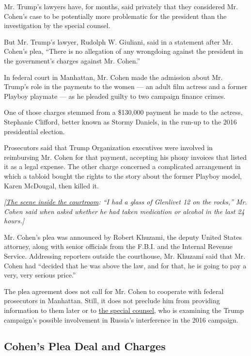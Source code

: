 Mr. Trump's lawyers have, for months, said privately that they
considered Mr. Cohen's case to be potentially more problematic for the
president than the investigation by the special counsel.

But Mr. Trump's lawyer, Rudolph W. Giuliani, said in a statement after
Mr. Cohen's plea, ``There is no allegation of any wrongdoing against the
president in the government's charges against Mr. Cohen.''

In federal court in Manhattan, Mr. Cohen made the admission about Mr.
Trump's role in the payments to the women --- an adult film actress and
a former Playboy playmate --- as he pleaded guilty to two campaign
finance crimes.

One of those charges stemmed from a \$130,000 payment he made to the
actress, Stephanie Clifford, better known as Stormy Daniels, in the
run-up to the 2016 presidential election.

Prosecutors said that Trump Organization executives were involved in
reimbursing Mr. Cohen for that payment, accepting his phony invoices
that listed it as a legal expense. The other charge concerned a
complicated arrangement in which a tabloid bought the rights to the
story about the former Playboy model, Karen McDougal, then killed it.

\emph{{[}}\href{https://www.nytimes.com/2018/08/21/nyregion/michael-cohen-guilty-glenlivet-trump.html}{\emph{The
scene inside the courtroom}}\emph{: ``I had a glass of Glenlivet 12 on
the rocks,'' Mr. Cohen said when asked whether he had taken medication
or alcohol in the last 24 hours.{]}}

Mr. Cohen's plea was announced by Robert Khuzami, the deputy United
States attorney, along with senior officials from the F.B.I. and the
Internal Revenue Service. Addressing reporters outside the courthouse,
Mr. Khuzami said that Mr. Cohen had ``decided that he was above the law,
and for that, he is going to pay a very, very serious price.''

The plea agreement does not call for Mr. Cohen to cooperate with federal
prosecutors in Manhattan. Still, it does not preclude him from providing
information to them later or to
\href{https://www.nytimes.com/2018/08/16/us/politics/special-counsel-investigation-mueller.html}{the
special counsel,} who is examining the Trump campaign's possible
involvement in Russia's interference in the 2016 campaign.

\hypertarget{cohens-plea-deal-and-charges}{%
\subsection{Cohen's Plea Deal and
Charges}\label{cohens-plea-deal-and-charges}}

